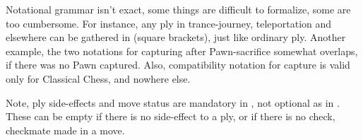 Notational grammar isn't exact, some things are difficult to formalize, some are
too cumbersome. For instance, any ply in trance-journey, teleportation and
elsewhere can be gathered in \alg{[ ]} (square brackets), just like ordinary ply.
Another example, the two notations for capturing after Pawn-sacrifice somewhat
overlaps, if there was no Pawn captured. Also, compatibility notation for capture
is valid only for Classical Chess, and nowhere else.

Note, ply side-effects and move status are mandatory in , not optional
as in . These can be empty if there is no side-effect to a ply, or if
there is no check, checkmate made in a move.

\clearpage %
